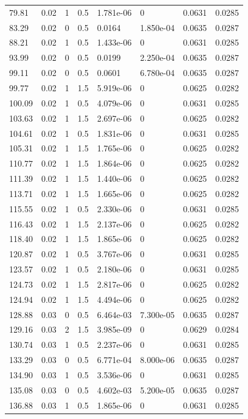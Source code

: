 \documentclass[preview]{standalone}
\begin{document}
{{\begin{tabular}{L{1.2cm}C{1.2cm} C{0.3cm}C{0.5cm} C{1.4cm}C{1.4cm} C{1.4cm}C{1.4cm}}
  79.81  &  0.02  & 1     & 0.5 &  1.781e-06  & 0  & 0.0631 &  0.0285   \\ 
  83.29  &  0.02  & 0     & 0.5 &  0.0164  & 1.850e-04  & 0.0635 &  0.0287   \\ 
  88.21  &  0.02  & 1     & 0.5 &  1.433e-06  & 0  & 0.0631 &  0.0285   \\ 
  93.99  &  0.02  & 0     & 0.5 &  0.0199  & 2.250e-04  & 0.0635 &  0.0287   \\ 
  99.11  &  0.02  & 0     & 0.5 &  0.0601  & 6.780e-04  & 0.0635 &  0.0287   \\ 
  99.77  &  0.02  & 1     & 1.5 &  5.919e-06  & 0  & 0.0625 &  0.0282   \\ 
  100.09  &  0.02  & 1     & 0.5 &  4.079e-06  & 0  & 0.0631 &  0.0285   \\ 
  103.63  &  0.02  & 1     & 1.5 &  2.697e-06  & 0  & 0.0625 &  0.0282   \\ 
  104.61  &  0.02  & 1     & 0.5 &  1.831e-06  & 0  & 0.0631 &  0.0285   \\ 
  105.31  &  0.02  & 1     & 1.5 &  1.765e-06  & 0  & 0.0625 &  0.0282   \\ 
  110.77  &  0.02  & 1     & 1.5 &  1.864e-06  & 0  & 0.0625 &  0.0282   \\ 
  111.39  &  0.02  & 1     & 1.5 &  1.440e-06  & 0  & 0.0625 &  0.0282   \\ 
  113.71  &  0.02  & 1     & 1.5 &  1.665e-06  & 0  & 0.0625 &  0.0282   \\ 
  115.55  &  0.02  & 1     & 0.5 &  2.330e-06  & 0  & 0.0631 &  0.0285   \\ 
  116.43  &  0.02  & 1     & 1.5 &  2.137e-06  & 0  & 0.0625 &  0.0282   \\ 
  118.40  &  0.02  & 1     & 1.5 &  1.865e-06  & 0  & 0.0625 &  0.0282   \\ 
  120.87  &  0.02  & 1     & 0.5 &  3.767e-06  & 0  & 0.0631 &  0.0285   \\ 
  123.57  &  0.02  & 1     & 0.5 &  2.180e-06  & 0  & 0.0631 &  0.0285   \\ 
  124.73  &  0.02  & 1     & 1.5 &  2.817e-06  & 0  & 0.0625 &  0.0282   \\ 
  124.94  &  0.02  & 1     & 1.5 &  4.494e-06  & 0  & 0.0625 &  0.0282   \\ 
  128.88  &  0.03  & 0     & 0.5 &  6.464e-03  & 7.300e-05  & 0.0635 &  0.0287   \\ 
  129.16  &  0.03  & 2     & 1.5 &  3.985e-09  & 0  & 0.0629 &  0.0284   \\ 
  130.74  &  0.03  & 1     & 0.5 &  2.237e-06  & 0  & 0.0631 &  0.0285   \\ 
  133.29  &  0.03  & 0     & 0.5 &  6.771e-04  & 8.000e-06  & 0.0635 &  0.0287   \\ 
  134.90  &  0.03  & 1     & 0.5 &  3.536e-06  & 0  & 0.0631 &  0.0285   \\ 
  135.08  &  0.03  & 0     & 0.5 &  4.602e-03  & 5.200e-05  & 0.0635 &  0.0287   \\ 
  136.88  &  0.03  & 1     & 0.5 &  1.865e-06  & 0  & 0.0631 &  0.0285   \\ 
\hline 
\end{tabular} 

}}
\end{document}
